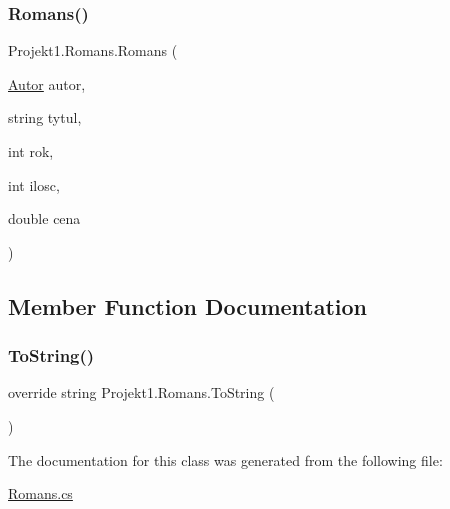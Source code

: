 \subsubsection{\texorpdfstring{Romans()}{Romans()}}
{\footnotesize\ttfamily Projekt1.\+Romans.\+Romans (\begin{DoxyParamCaption}\item[{\mbox{\hyperlink{class_projekt1_1_1_autor}{Autor}}}]{autor,  }\item[{string}]{tytul,  }\item[{int}]{rok,  }\item[{int}]{ilosc,  }\item[{double}]{cena }\end{DoxyParamCaption})}



\subsection{Member Function Documentation}
\mbox{\label{class_projekt1_1_1_romans_a30da5534f179120d2899e5afef641668}} 
\subsubsection{\texorpdfstring{ToString()}{ToString()}}
{\footnotesize\ttfamily override string Projekt1.\+Romans.\+To\+String (\begin{DoxyParamCaption}{ }\end{DoxyParamCaption})}



The documentation for this class was generated from the following file\+:\begin{DoxyCompactItemize}
\item 
\mbox{\hyperlink{_romans_8cs}{Romans.\+cs}}\end{DoxyCompactItemize}

